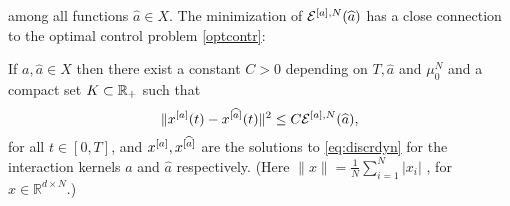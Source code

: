 among all functions $\widehat a \in X$. 
The minimization of $\mathcal E^{[a],N}(\widehat a)$ has a close connection to the optimal control problem \eqref{optcontr}:
\begin{proposition}\label{trajapprox}
If $a,\widehat a \in X$ then there exist a constant $C>0$ depending on $T,\widehat a$ and $\mu_0^N$ and a compact set $K \subset \mathbb{R}_+$ such that
\begin{equation}\label{eq:trajapprox}
\| x^{[a]} (t) -x^{[\widehat a]}  (t) \|^2 \leq C {\mathcal E^{[a],N}(\widehat a)}, 
\end{equation}
for all $t \in [0,T]$, and $x^{[a]} , x^{[\widehat a]}  $ are the solutions to \eqref{eq:discrdyn} for the interaction kernels $a$ and $\widehat a$ respectively. (Here $\| x \| = \frac{1}{N} \sum_{i=1}^N |x_i|$ , for $x \in \mathbb R^{d \times N}$.)
\end{proposition}


